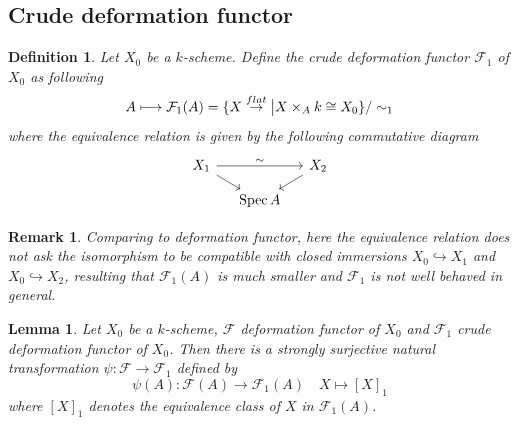\documentclass{ctexart}
\newtheorem{definition}{Definition}[section]
\newtheorem{remark}{Remark}[section]
\newtheorem{lemma}{Lemma}[section]
\newcommand{\spec}{\operatorname{Spec}}
\begin{document}
\subsection{Crude deformation functor}
\label{subsection:Formal_Family_Crude_deformation_functor}

\begin{definition}
    Let $X_{0}$ be a $k$-scheme.
    Define the crude deformation functor $\mathcal{F}_{1}$ of $X_{0}$ as following
    \begin{equation}
        A \longmapsto \mathcal{F}_{1}(A) = \{X \overset{flat}{\rightarrow} \big{|} X \times_{A} k \cong X_{0}\}/\sim_{1}
    \end{equation}
    where the equivalence relation is given by the following commutative diagram
    \begin{equation}
        \begin{tikzcd}[sep = small]
            X_{1} \arrow[rr, "\sim"] \arrow[dr] &&
            X_{2} \arrow[dl] \\
            & \spec A &
        \end{tikzcd}
    \end{equation}
\end{definition}
\begin{remark}
    Comparing to deformation functor, here the equivalence relation does not ask the isomorphism to be compatible with closed immersions $X_{0} \hookrightarrow X_{1}$ and $X_{0} \hookrightarrow X_{2}$,
    resulting that $\mathcal{F}_{1}(A)$ is much smaller and $\mathcal{F}_{1}$ is not well behaved in general.
\end{remark}
\begin{lemma}
    Let $X_{0}$ be a $k$-scheme, $\mathcal{F}$ deformation functor of $X_{0}$ and $\mathcal{F}_{1}$ crude deformation functor of $X_{0}$.
    Then there is a strongly surjective natural transformation $\psi: \mathcal{F} \rightarrow \mathcal{F}_{1}$ defined by
    \begin{equation}
        \psi(A): \mathcal{F}(A) \longrightarrow \mathcal{F}_{1}(A)\quad X \longmapsto [X]_{1}
    \end{equation}
    where $[X]_{1}$ denotes the equivalence class of $X$ in $\mathcal{F}_{1}(A)$.
    \label{Lemma 4.3}
\end{lemma}
\end{document}
